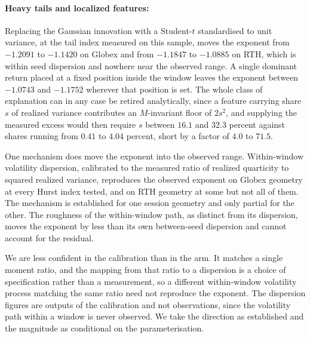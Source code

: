 \paragraph{Heavy tails and localized features:} Replacing the Gaussian
innovation with a Student-$t$ standardised to unit variance, at the tail index
measured on this sample, moves the exponent from $-1.2091$ to $-1.1420$ on Globex %
and from $-1.1847$ to $-1.0885$ on RTH, which is within seed dispersion and %
nowhere near the observed range. A single dominant return placed at a fixed
position inside the window leaves the exponent between $-1.0743$ and $-1.1752$ %
wherever that position is set. The whole class of explanation can in any case be
retired analytically, since a feature carrying share $s$ of realized variance
contributes an $M$-invariant floor of $2s^2$, and supplying the measured excess
would then require $s$ between $16.1$ and $32.3$ percent against shares running %
from $0.41$ to $4.04$ percent, short by a factor of $4.0$ to $71.5$. %

One mechanism does move the exponent into the observed range. Within-window
volatility dispersion, calibrated to the measured ratio of realized quarticity to
squared realized variance, reproduces the observed exponent on Globex geometry at
every Hurst index tested, and on RTH geometry at some but not all of them. The
mechanism is established for one session geometry and only partial for the other.
The roughness of the within-window path, as distinct from its dispersion, moves
the exponent by less than its own between-seed dispersion and cannot account for
the residual.

We are less confident in the calibration than in the arm. It matches a single
moment ratio, and the mapping from that ratio to a dispersion is a choice of
specification rather than a measurement, so a different within-window volatility
process matching the same ratio need not reproduce the exponent. The dispersion
figures are outputs of the calibration and not observations, since the volatility
path within a window is never observed. We take the direction as established and
the magnitude as conditional on the parameterisation.
